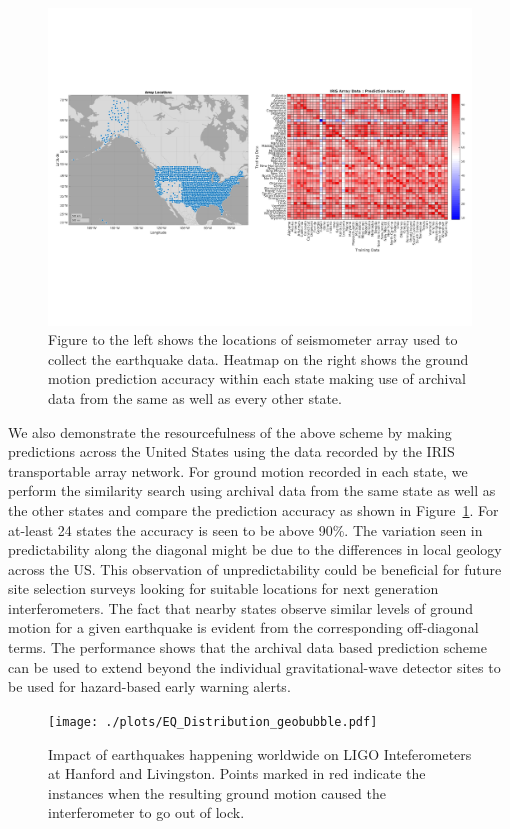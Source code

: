 \documentclass[preprint, aps, showpacs]{revtex4-1}
\begin{document}
\begin{figure}[!htb]
 \includegraphics[width=\textwidth]{./plots/USArray_with_HeatMap}
 \caption{Figure to the left shows the locations of seismometer array used to collect the earthquake data. Heatmap on the right shows the ground motion prediction accuracy within each state making use of archival data from the same as well as every other state.}
 \label{fig:map}
\end{figure}

We also demonstrate the resourcefulness  of the above scheme by making predictions across the United States using the data recorded by the IRIS transportable array network. For ground motion recorded in each state, we perform the similarity search using archival data from the same state as well as the other states and compare the prediction accuracy as shown in Figure~\ref{fig:map}.  For at-least 24 states the accuracy is seen to be above 90\%. The variation seen in predictability along the diagonal might be due to the differences in local geology across the US. This observation of unpredictability could be beneficial for future site selection surveys looking for suitable locations for next generation interferometers. The fact that nearby states observe similar levels of ground motion for a given earthquake is evident from the corresponding off-diagonal terms.  
The performance shows that the archival data based prediction scheme can be used to extend beyond the individual gravitational-wave detector sites to be used for hazard-based early warning alerts.

\begin{figure}[!htb]
 \texttt{[image: ./plots/EQ\_Distribution\_geobubble.pdf]}
 \caption{Impact of earthquakes happening worldwide on LIGO Inteferometers at Hanford and Livingston. Points marked in red indicate the instances when the resulting ground motion caused the interferometer to go out of lock.}
 \label{fig:lockloss_distribution}
\end{figure}
\end{document}
